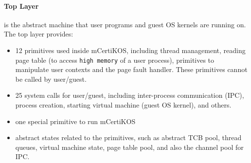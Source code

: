 \paragraph{Top Layer} is the abstract machine that user programs and guest OS kernels are running on. The top layer provides:
\begin{itemize}
\item 12 primitives used inside mCertiKOS, including thread
  management, reading page table (to access \verb"high memory" of a user
  process), primitives to manipulate user contexts and the page fault
  handler. These primitives cannot be called by user/guest.
\item 25 system calls for user/guest, including inter-process
  communication (IPC), process creation, starting virtual machine
  (guest OS kernel), and others. %
\item one special primitive to run mCertiKOS
\item abstract states related to the primitives, such as abstract TCB pool, thread queues, virtual machine state, page table pool, and also the channel pool for IPC.
\end{itemize}






